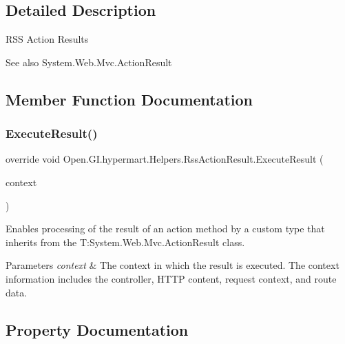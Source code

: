 \subsection{Detailed Description}
R\+SS Action Results 

\begin{DoxySeeAlso}{See also}
System.\+Web.\+Mvc.\+Action\+Result


\end{DoxySeeAlso}


\subsection{Member Function Documentation}
\hypertarget{class_open_1_1_g_i_1_1hypermart_1_1_helpers_1_1_rss_action_result_a18ff30f679b2858b2d88a7dc267fd672}{}\label{class_open_1_1_g_i_1_1hypermart_1_1_helpers_1_1_rss_action_result_a18ff30f679b2858b2d88a7dc267fd672} 
\subsubsection{\texorpdfstring{Execute\+Result()}{ExecuteResult()}}
{\footnotesize\ttfamily override void Open.\+G\+I.\+hypermart.\+Helpers.\+Rss\+Action\+Result.\+Execute\+Result (\begin{DoxyParamCaption}\item[{Controller\+Context}]{context }\end{DoxyParamCaption})}



Enables processing of the result of an action method by a custom type that inherits from the T\+:\+System.\+Web.\+Mvc.\+Action\+Result class. 


\begin{DoxyParams}{Parameters}
{\em context} & The context in which the result is executed. The context information includes the controller, H\+T\+TP content, request context, and route data.\\
\hline
\end{DoxyParams}


\subsection{Property Documentation}
\hypertarget{class_open_1_1_g_i_1_1hypermart_1_1_helpers_1_1_rss_action_result_a3b07cc4558b6a4863821fbedd9aa6888}{}\label{class_open_1_1_g_i_1_1hypermart_1_1_helpers_1_1_rss_action_result_a3b07cc4558b6a4863821fbedd9aa6888} 
